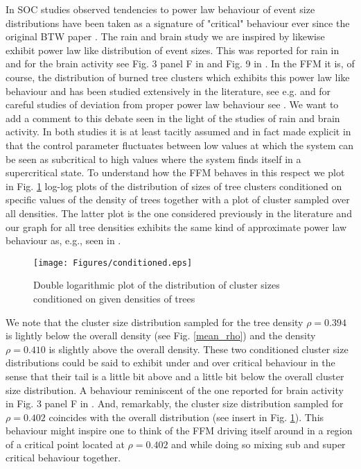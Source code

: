 \documentclass[aps,prl,showpacs,superscriptaddress,groupedaddress,notitlepage]{revtex4-1}
\begin{document}
In SOC studies observed tendencies to power law behaviour of event size distributions have been taken as a signature of "critical" behaviour \cite{Jensen1998,Gunnar_Book} ever since the original BTW paper \cite{BTW1987}. The rain and brain study we are inspired by likewise exhibit power law like distribution of event sizes. This was reported for rain in \cite{Peters2002} and for the brain activity see Fig. 3 panel F in \cite{Chialvo2012} and Fig. 9 in \cite{Scott2014}. In the FFM it is, of course, the distribution of burned tree clusters which exhibits this power law like behaviour and has been studied extensively in the literature, see e.g. \cite{Gunnar_Book} and for careful studies of deviation from proper power law behaviour see  \cite{Grassberger1993,Pruessner2002,Grassberger2002}. We want to add a comment to this debate seen in the light of the studies of rain and brain activity. In both studies it is at least tacitly assumed and in fact made explicit in \cite{Chialvo2012} that the control parameter fluctuates between low values at which the system can be seen as subcritical to high values where the system finds itself in a supercritical state. To understand how the FFM behaves in this respect we plot in Fig. \ref{Cluster_Condi} log-log plots of the distribution of sizes of tree clusters conditioned on specific values of the density of trees together with a plot of cluster sampled over all densities. The latter plot is the one considered previously in the literature and our graph for all tree densities exhibits the same kind of approximate power law behaviour as, e.g., seen in \cite{Pruessner2002}. 


\begin{figure}[!h]
\centering
\texttt{[image: Figures/conditioned.eps]}\\
  
\caption{Double logarithmic plot of the distribution of cluster sizes conditioned on given densities of trees}
\label{Cluster_Condi}
\end{figure}
 
We note that the cluster size distribution sampled for the tree density $\rho=0.394$ is lightly below the overall density (see Fig. \ref{mean_rho}) and the density $\rho=0.410$ is slightly above the overall density. These two conditioned cluster size distributions could be said to exhibit under and over critical behaviour in the sense that their tail is a little bit above and a little bit below the overall cluster size distribution. A behaviour reminiscent of the one reported for brain activity in Fig. 3 panel F in \cite{Chialvo2012}. And, remarkably, the cluster size distribution sampled for $\rho=0.402$ coincides with the overall distribution (see insert in Fig. \ref{Cluster_Condi}). This behaviour might inspire one to think of the FFM driving itself around in a region of a critical point located at $\rho=0.402$ and while doing so mixing sub and super critical behaviour together. 
\end{document}
